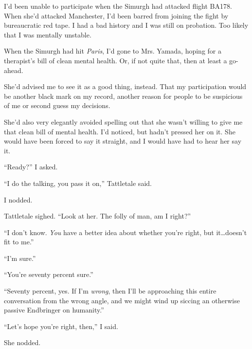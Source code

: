 I'd been unable to participate when the Simurgh had attacked flight BA178.  When she'd attacked Manchester, I'd been barred from joining the fight by bureaucratic red tape.  I had a bad history and I was still on probation.  Too likely that I was mentally unstable.



When the Simurgh had hit \emph{Paris}, I'd gone to Mrs. Yamada, hoping for a therapist's bill of clean mental health.  Or, if not quite that, then at least a go-ahead.



She'd advised me to see it as a good thing, instead.  That my participation would be another black mark on my record, another reason for people to be suspicious of me or second guess my decisions.



She'd also very elegantly avoided spelling out that she wasn't willing to give me that clean bill of mental health.  I'd noticed, but hadn't pressed her on it.  She would have been forced to say it straight, and I would have had to hear her say it.



``Ready?'' I asked.



``I do the talking, you pass it on,'' Tattletale said.



I nodded.



Tattletale sighed.  ``Look at her.  The folly of man, am I right?''



``I don't know.  \emph{You} have a better idea about whether you're right, but it\ldots doesn't fit to me.''



``I'm sure.''



``You're seventy percent sure.''



``Seventy percent, yes.  If I'm \emph{wrong}, then I'll be approaching this entire conversation from the wrong angle, and we might wind up siccing an otherwise passive Endbringer on humanity.''



``Let's hope you're right, then,'' I said.



She nodded.



